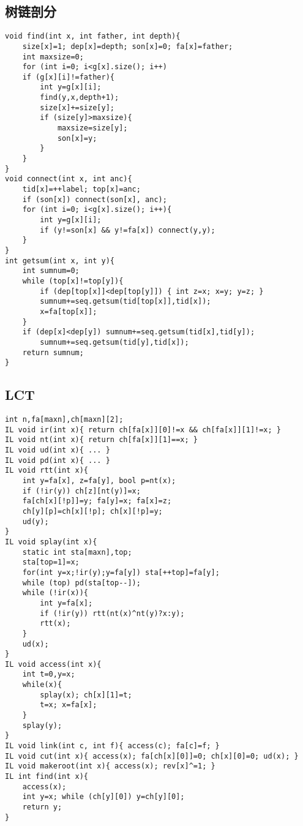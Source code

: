 \documentclass{article}
\begin{document}
\subsection{树链剖分}
\begin{lstlisting}
void find(int x, int father, int depth){
    size[x]=1; dep[x]=depth; son[x]=0; fa[x]=father;
    int maxsize=0;
    for (int i=0; i<g[x].size(); i++)
    if (g[x][i]!=father){
        int y=g[x][i];
        find(y,x,depth+1);
        size[x]+=size[y];
        if (size[y]>maxsize){
            maxsize=size[y];
            son[x]=y;
        }
    }
}
void connect(int x, int anc){
    tid[x]=++label; top[x]=anc;
    if (son[x]) connect(son[x], anc);
    for (int i=0; i<g[x].size(); i++){
        int y=g[x][i];
        if (y!=son[x] && y!=fa[x]) connect(y,y);
    }
}
int getsum(int x, int y){
    int sumnum=0;
    while (top[x]!=top[y]){
        if (dep[top[x]]<dep[top[y]]) { int z=x; x=y; y=z; }
        sumnum+=seq.getsum(tid[top[x]],tid[x]);
        x=fa[top[x]];
    }
    if (dep[x]<dep[y]) sumnum+=seq.getsum(tid[x],tid[y]);
        sumnum+=seq.getsum(tid[y],tid[x]);
    return sumnum;
}
\end{lstlisting}

\subsection{LCT}
\begin{lstlisting}
int n,fa[maxn],ch[maxn][2];
IL void ir(int x){ return ch[fa[x]][0]!=x && ch[fa[x]][1]!=x; }
IL void nt(int x){ return ch[fa[x]][1]==x; }
IL void ud(int x){ ... }
IL void pd(int x){ ... }
IL void rtt(int x){
	int y=fa[x], z=fa[y], bool p=nt(x);
	if (!ir(y)) ch[z][nt(y)]=x;
	fa[ch[x][!p]]=y; fa[y]=x; fa[x]=z;
	ch[y][p]=ch[x][!p]; ch[x][!p]=y;
	ud(y);
}
IL void splay(int x){
	static int sta[maxn],top;
	sta[top=1]=x;
	for(int y=x;!ir(y);y=fa[y]) sta[++top]=fa[y];
	while (top) pd(sta[top--]);
	while (!ir(x)){
		int y=fa[x];
		if (!ir(y)) rtt(nt(x)^nt(y)?x:y);
		rtt(x);
	}
	ud(x);
}
IL void access(int x){
	int t=0,y=x;
	while(x){
		splay(x); ch[x][1]=t;
		t=x; x=fa[x];
	}
	splay(y);
}
IL void link(int c, int f){ access(c); fa[c]=f; }
IL void cut(int x){ access(x); fa[ch[x][0]]=0; ch[x][0]=0; ud(x); }
IL void makeroot(int x){ access(x); rev[x]^=1; }
IL int find(int x){
	access(x);
	int y=x; while (ch[y][0]) y=ch[y][0];
	return y;
}
\end{lstlisting}
\end{document}
